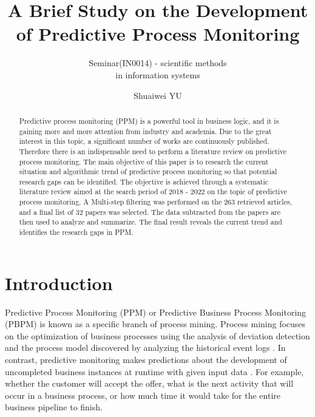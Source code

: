 \documentclass[runningheads]{llncs}
\begin{document}
	\title{A Brief Study on the Development of Predictive Process Monitoring}
	\subtitle{Seminar(IN0014) - scientific methods \\ in information systems}
	\author{Shuaiwei YU  }
	\maketitle
	
	\begin{abstract}
		Predictive process monitoring (PPM) is a powerful tool in business logic, and it is gaining more and more attention from industry and academia. Due to the great interest in this topic, a significant number of works are continuously published. Therefore there is an indispensable need to perform a literature review on predictive process monitoring. The main objective of this paper is to research the current situation and algorithmic trend of predictive process monitoring so that potential research gaps can be identified. The objective is achieved through a systematic literature review aimed at the search period of 2018 - 2022 on the topic of predictive process monitoring. A Multi-step filtering was performed on the 263 retrieved articles, and a final list of 32 papers was selected. The data subtracted from the papers are then used to analyze and summarize. The final result reveals the current trend and identifies the research gaps in PPM.

	\end{abstract}
	
	\section{Introduction}
		Predictive Process Monitoring (PPM) or Predictive Business Process Monitoring (PBPM) is known as a specific branch of process mining. Process mining focuses on the optimization of business processes using the analysis of deviation detection and the process model discovered by analyzing the historical event logs \cite{art-8}. In contrast, predictive monitoring makes predictions about the development of uncompleted business instances at runtime with given input data \cite{original}. For example, whether the customer will accept the offer, what is the next activity that will occur in a business process, or how much time it would take for the entire business pipeline to finish. 
	
\end{document}

